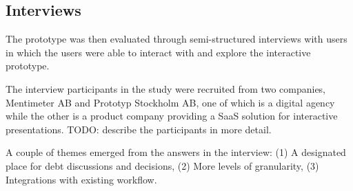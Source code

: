 \subsection{Interviews}

The prototype was then evaluated through semi-structured interviews with users in which the users were able to interact with and explore the interactive prototype.

The interview participants in the study were recruited from two companies, Mentimeter AB and Prototyp Stockholm AB, one of which is a digital agency while the other is a product company providing a SaaS solution for interactive presentations. TODO: describe the participants in more detail.

A couple of themes emerged from the answers in the interview: (1) A designated place for debt discussions and decisions, (2) More levels of granularity, (3) Integrations with existing workflow.